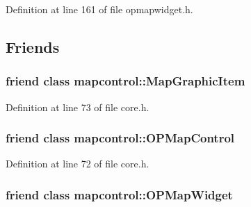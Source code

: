 Definition at line 161 of file opmapwidget.\-h.



\subsection{Friends}
\hypertarget{group___o_p_map_widget_ga4fb537bcd209fc77cf5b8c9e38360c07}{
\subsubsection[{mapcontrol\-::\-Map\-Graphic\-Item}]{\setlength{\rightskip}{0pt plus 5cm}friend class {\bf mapcontrol\-::\-Map\-Graphic\-Item}\hspace{0.3cm}{\ttfamily [friend]}}}\label{group___o_p_map_widget_ga4fb537bcd209fc77cf5b8c9e38360c07}


Definition at line 73 of file core.\-h.

\hypertarget{group___o_p_map_widget_ga88abf786b489e97fc16ff6c07da3626e}{
\subsubsection[{mapcontrol\-::\-O\-P\-Map\-Control}]{\setlength{\rightskip}{0pt plus 5cm}friend class mapcontrol\-::\-O\-P\-Map\-Control\hspace{0.3cm}{\ttfamily [friend]}}}\label{group___o_p_map_widget_ga88abf786b489e97fc16ff6c07da3626e}


Definition at line 72 of file core.\-h.

\hypertarget{group___o_p_map_widget_gaab6f3be35d4d41ee35530f402954d903}{
\subsubsection[{mapcontrol\-::\-O\-P\-Map\-Widget}]{\setlength{\rightskip}{0pt plus 5cm}friend class {\bf mapcontrol\-::\-O\-P\-Map\-Widget}\hspace{0.3cm}{\ttfamily [friend]}}}\label{group___o_p_map_widget_gaab6f3be35d4d41ee35530f402954d903}



